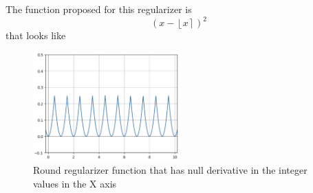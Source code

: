 \documentclass[12pt]{extarticle}
\numberwithin{equation}{section}
\begin{document}
The function proposed for this regularizer is
\begin{equation}
    (x - \left\lfloor x \right\rceil )^2
\end{equation}
that looks like
\begin{figure}[H]
    \centering
    \includegraphics[width=0.5\textwidth]{images/round_integers}
    \caption{Round regularizer function that has null derivative in the integer values in the X axis}
    \label{fig:reg round}
\end{figure}
\end{document}
